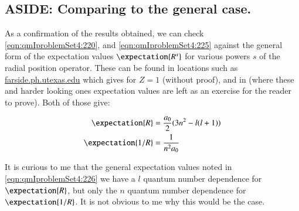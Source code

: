 \subsection{ASIDE: Comparing to the general case.}

As a confirmation of the results obtained, we can check \ref{eqn:qmIproblemSet4:220}, and \ref{eqn:qmIproblemSet4:225} against the general form of the expectation values $\expectation{R^s}$ for various powers $s$ of the radial position operator.  These can be found in locations such as \href{http://farside.ph.utexas.edu/teaching/qmech/lectures/node81.html}{farside.ph.utexas.edu} which gives for $Z=1$ (without proof), and in \cite{liboff2003iqm} (where these and harder looking ones expectation values are left as an exercise for the reader to prove).  Both of those give:

\begin{align}\label{eqn:qmIproblemSet4:226}
\expectation{R} &= \frac{a_0}{2} ( 3 n^2 -l (l+1) ) \\
\expectation{1/R} &= \frac{1}{n^2 a_0} 
\end{align}

It is curious to me that the general expectation values noted in \ref{eqn:qmIproblemSet4:226} we have a $l$ quantum number dependence for $\expectation{R}$, but only the $n$ quantum number dependence for $\expectation{1/R}$.  It is not obvious to me why this would be the case.

